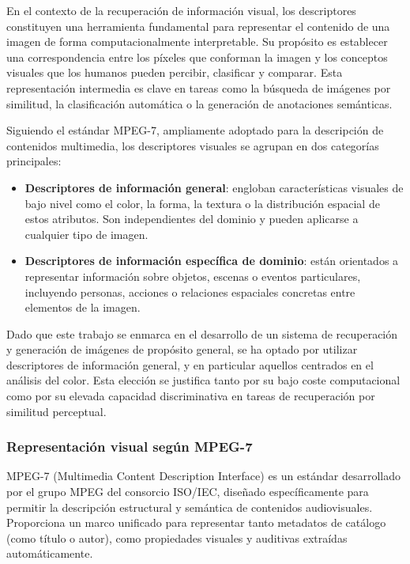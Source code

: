 En el contexto de la recuperación de información visual, los descriptores constituyen una herramienta fundamental para representar el contenido de una imagen de forma computacionalmente interpretable. Su propósito es establecer una correspondencia entre los píxeles que conforman la imagen y los conceptos visuales que los humanos pueden percibir, clasificar y comparar. Esta representación intermedia es clave en tareas como la búsqueda de imágenes por similitud, la clasificación automática o la generación de anotaciones semánticas.

Siguiendo el estándar MPEG-7, ampliamente adoptado para la descripción de contenidos multimedia, los descriptores visuales se agrupan en dos categorías principales:

\begin{itemize}
    \item \textbf{Descriptores de información general}: engloban características visuales de bajo nivel como el color, la forma, la textura o la distribución espacial de estos atributos. Son independientes del dominio y pueden aplicarse a cualquier tipo de imagen.
    \item \textbf{Descriptores de información específica de dominio}: están orientados a representar información sobre objetos, escenas o eventos particulares, incluyendo personas, acciones o relaciones espaciales concretas entre elementos de la imagen.
\end{itemize}

Dado que este trabajo se enmarca en el desarrollo de un sistema de recuperación y generación de imágenes de propósito general, se ha optado por utilizar descriptores de información general, y en particular aquellos centrados en el análisis del color. Esta elección se justifica tanto por su bajo coste computacional como por su elevada capacidad discriminativa en tareas de recuperación por similitud perceptual.

\subsubsection{Representación visual según MPEG-7}

MPEG-7 (Multimedia Content Description Interface) es un estándar desarrollado por el grupo MPEG del consorcio ISO/IEC, diseñado específicamente para permitir la descripción estructural y semántica de contenidos audiovisuales. Proporciona un marco unificado para representar tanto metadatos de catálogo (como título o autor), como propiedades visuales y auditivas extraídas automáticamente.

